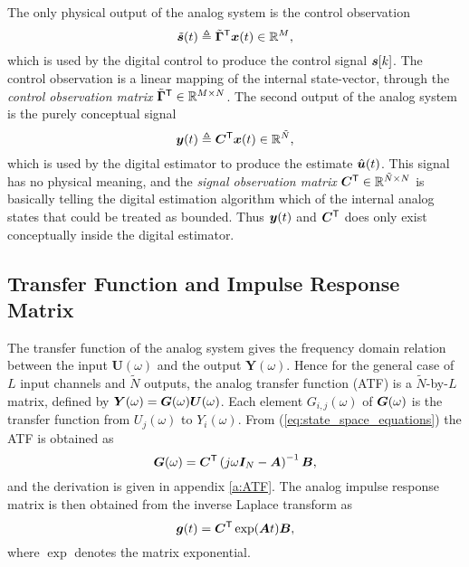 The only physical output of the analog system is the control observation
\begin{equation}
    \label{eq:def_control_observation}
    \tilde{\bm{s}}(t) \triangleq \tilde{\bm{\Gamma}}^\mathsf{T} \bm{x}(t) \in \mathbb{R}^{M},
\end{equation}
which is used by the digital control to produce the control signal $\bm{s}[k]$. The control observation is a linear mapping of the internal state-vector, through the \textit{control observation matrix} $\tilde{\bm{\Gamma}}^\mathsf{T} \in \mathbb{R}^{M \times N}$.
The second output of the analog system is the purely conceptual signal
\begin{equation}
    \label{eq:def_as_output}
    \bm{y}(t) \triangleq \bm{C}^\mathsf{T} \bm{x}(t) \in \mathbb{R}^{\tilde{N}},
\end{equation}
 which is used by the digital estimator to produce the estimate $\hat{\bm{u}}(t)$. This signal has no physical meaning, and the \textit{signal observation matrix} $\bm{C}^\mathsf{T} \in \mathbb{R}^{\tilde{N} \times N}$ is basically telling the digital estimation algorithm which of the internal analog states that could be treated as bounded. Thus $\bm{y}(t)$ and $\bm{C}^\mathsf{T}$ does only exist conceptually inside the digital estimator.

\subsection{Transfer Function and Impulse Response Matrix}
\label{sec:as_tf}
The transfer function of the analog system gives the frequency domain relation between the input $\bm{U}(\omega)$ and the output $\bm{Y}(\omega)$. Hence for the general case of $L$ input channels and $\tilde{N}$ outputs, the analog transfer function (ATF) is a $\tilde{N}$-by-$L$ matrix, defined by $\bm{Y}(\omega) = \bm{G}(\omega) \bm{U}(\omega)$. Each element $G_{i,j}(\omega)$ of $\bm{G}(\omega)$ is the transfer function from $U_j(\omega)$ to $Y_i(\omega)$. From (\ref{eq:state_space_equations}) the ATF is obtained as
\begin{equation}
    \label{eq:ATF_def}
    \bm{G}(\omega) = \bm{C}^\mathsf{T}\left(j\omega \bm{I}_{N} - \bm{A} \right)^{-1}\bm{B},
\end{equation}
and the derivation is given in appendix \ref{a:ATF}. The analog impulse response matrix is then obtained from the inverse Laplace transform as
\begin{equation}
    \bm{g}(t) = \bm{C}^\mathsf{T} \exp(\bm{A} t) \bm{B},
\end{equation}
where $\exp$ denotes the matrix exponential.






























